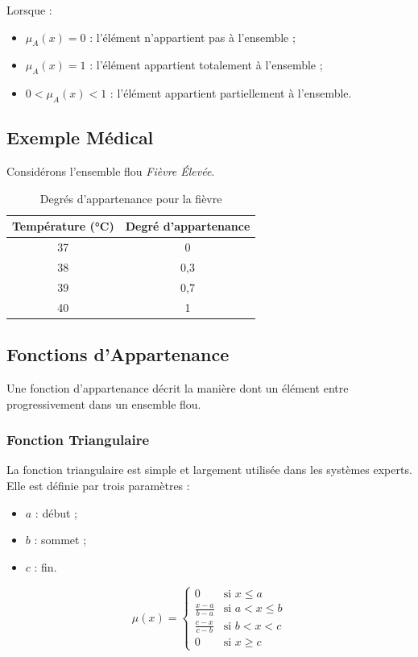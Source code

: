\documentclass[a4paper,12pt]{report} %
\begin{document}
Lorsque :
\begin{itemize}
\item \( \mu_A(x) = 0 \) : l'élément n'appartient pas à l'ensemble ;
\item \( \mu_A(x) = 1 \) : l'élément appartient totalement à l'ensemble ;
\item \( 0 < \mu_A(x) < 1 \) : l'élément appartient partiellement à l'ensemble.
\end{itemize}

\subsection*{Exemple Médical}

Considérons l'ensemble flou \textit{Fièvre Élevée}.

\begin{table}[H]
\centering
\caption{Degrés d'appartenance pour la fièvre}
\begin{tabular}{|c|c|}
\hline
\textbf{Température (°C)} & \textbf{Degré d'appartenance} \\
\hline
37 & 0 \\
38 & 0,3 \\
39 & 0,7 \\
40 & 1 \\
\hline
\end{tabular}
\end{table}

\subsection{Fonctions d'Appartenance}

Une fonction d'appartenance décrit la manière dont un élément entre progressivement dans un ensemble flou.

\subsubsection{Fonction Triangulaire}

La fonction triangulaire est simple et largement utilisée dans les systèmes experts. Elle est définie par trois paramètres :
\begin{itemize}
\item \( a \) : début ;
\item \( b \) : sommet ;
\item \( c \) : fin.
\end{itemize}

\[
\mu(x) = 
\begin{cases}
0 & \text{si } x \leq a \\
\frac{x-a}{b-a} & \text{si } a < x \leq b \\
\frac{c-x}{c-b} & \text{si } b < x < c \\
0 & \text{si } x \geq c
\end{cases}
\]
\end{document}
